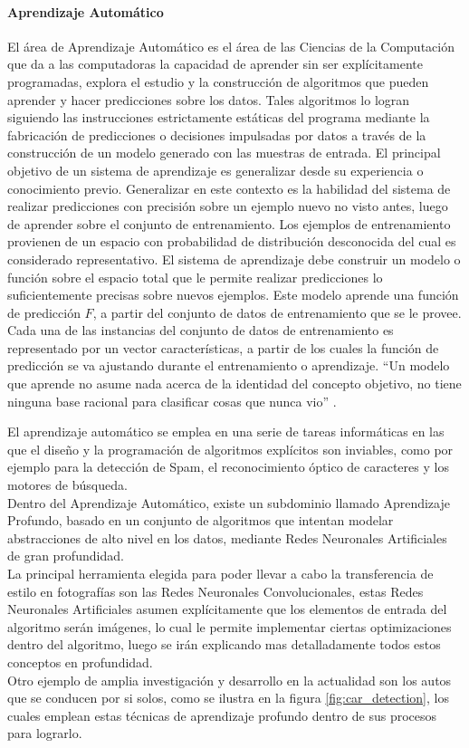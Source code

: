 \documentclass[a4paper,11pt,spanish]{book}
\begin{document}
    \paragraph{Aprendizaje Automático}
      El área de Aprendizaje Automático es el área de las Ciencias de la Computación que da a las computadoras la capacidad de aprender sin ser explícitamente programadas, explora el estudio
      y la construcción de algoritmos que pueden aprender y hacer predicciones sobre los datos. Tales algoritmos lo logran siguiendo las instrucciones estrictamente estáticas del programa
      mediante la fabricación de predicciones o decisiones impulsadas por datos a través de la construcción de un modelo generado con las muestras de entrada.
      El principal objetivo de un sistema de aprendizaje es generalizar desde su experiencia o conocimiento previo. Generalizar en este contexto es la habilidad del sistema de realizar
      predicciones con precisión sobre un ejemplo nuevo no visto antes, luego de aprender sobre el conjunto de entrenamiento. Los ejemplos de entrenamiento provienen de un espacio
      con probabilidad de distribución desconocida del cual es considerado representativo. El sistema de aprendizaje debe construir un modelo o función sobre el espacio total que le permite realizar
      predicciones lo suficientemente precisas sobre nuevos ejemplos. Este modelo aprende una función de predicción $F$, a partir del conjunto de datos de entrenamiento que se le provee.
      Cada una de las instancias del conjunto de datos de entrenamiento es representado por un vector características, a partir de los cuales la función de predicción
      se va ajustando durante el entrenamiento o aprendizaje.
      “Un modelo que aprende no asume nada acerca de la identidad del concepto objetivo, no tiene ninguna base racional para clasificar cosas que nunca vio” \cite{Mitchell:1997:ML:541177}.

      El aprendizaje automático se emplea en una serie de tareas informáticas en las que el diseño y la programación de algoritmos explícitos son inviables, como por ejemplo para la detección de Spam, el reconocimiento
      óptico de caracteres y los motores de búsqueda.\\
      Dentro del Aprendizaje Automático, existe un subdominio llamado Aprendizaje Profundo, basado en un conjunto de algoritmos que intentan modelar abstracciones de alto nivel en los datos,
      mediante Redes Neuronales Artificiales de gran profundidad.\\
      La principal herramienta elegida para poder llevar a cabo la transferencia de estilo en fotografías son las Redes Neuronales Convolucionales, estas Redes Neuronales Artificiales asumen
      explícitamente que los elementos de  entrada del algoritmo serán imágenes, lo cual le permite implementar ciertas optimizaciones dentro del algoritmo, luego
      se irán explicando mas detalladamente todos estos conceptos en profundidad.\\
      Otro ejemplo de amplia investigación y desarrollo en la actualidad son los autos que se conducen por si solos, como se ilustra en la figura \ref{fig:car_detection},
      los cuales emplean estas técnicas de aprendizaje profundo dentro de sus procesos para lograrlo.
\end{document}
